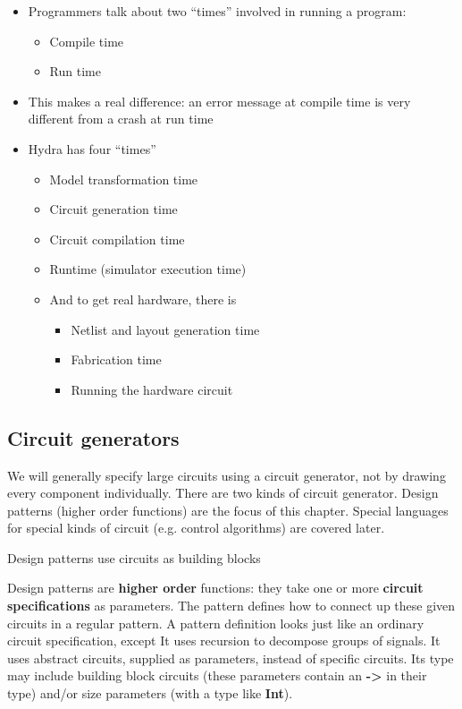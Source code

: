 \documentclass[]{svmono}
\begin{document}
\begin{itemize}
\item Programmers talk about two ``times'' involved in running a
program:

\begin{itemize}
\item Compile time
\item Run time
\end{itemize}

\item This makes a real difference: an error message at compile
time is very different from a crash at run time
\item Hydra has four ``times''

\begin{itemize}
\item Model transformation time
\item Circuit generation time
\item Circuit compilation time
\item Runtime (simulator execution time)
\item And to get real hardware, there is

\begin{itemize}
\item Netlist and layout generation time
\item Fabrication time
\item Running the hardware circuit
\end{itemize}
\end{itemize}
\end{itemize}
\subsection*{Circuit generators}
\label{sec:org2454de7}

We will generally specify large circuits using a circuit generator,
not by drawing every component individually.  There are two kinds of
circuit generator.  Design patterns (higher order functions) are the
focus of this chapter.  Special languages for special kinds of circuit
(e.g. control algorithms) are covered later.

Design patterns use circuits as building blocks

Design patterns are \textbf{higher order} functions: they take one or
more \textbf{circuit specifications} as parameters.  The pattern defines
how to connect up these given circuits in a regular pattern.  A
pattern definition looks just like an ordinary circuit specification,
except It uses recursion to decompose groups of signals.  It uses
abstract circuits, supplied as parameters, instead of specific
circuits.  Its type may include building block circuits (these
parameters contain an \textbf{->} in their type) and/or size
parameters (with a type like \textbf{Int}).
\end{document}
